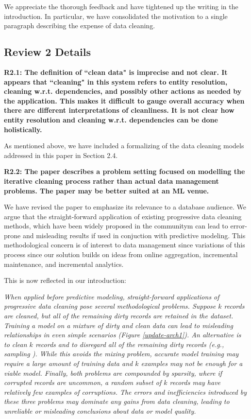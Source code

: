 We appreciate the thorough feedback and have tightened up the writing in the introduction. In particular, we have consolidated the motivation to a single paragraph describing the expense of data cleaning.


\subsection*{Review 2 Details}

\noindent\textbf{R2.1: The definition of ``clean data" is imprecise and not clear. It appears that ``cleaning" in this system refers to entity resolution, cleaning w.r.t. dependencies, and possibly other actions as needed by the application. This makes it difficult to gauge overall accuracy when there are different interpretations of cleanliness. It is not clear how entity resolution and cleaning w.r.t. dependencies can be done holistically.}

As mentioned above, we have included a formalizing of the data cleaning models addressed in this paper in Section 2.4. 

\vspace{0.5em}

\noindent\textbf{R2.2: The paper describes a problem setting focused on modelling the iterative cleaning process rather than actual data management problems. The paper may be better suited at an ML venue.}

We have revised the paper to emphasize its relevance to a database audience. We argue that the straight-forward application of existing progressive data cleaning methods, which have been widely proposed in the communitym can lead to error-prone and misleading results if used in conjuction with predictive modeling. This methodological concern is of interest to data management since variations of this process since our solution builds on ideas from online aggregation, incremental maintenance, and incremental analytics.

This is now reflected in our introduction:

\emph{When applied before predictive modeling, straight-forward applications of progressive data cleaning pose several methodological problems.
Suppose $k$ records are cleaned, but all of the remaining dirty records are retained in the dataset.
Training a model on a mixture of dirty and clean data can lead to misleading relationships in even simple scenarios (Figure \ref{update-arch1}).
An alternative is to clean $k$ records and to disregard all of the remaining dirty records (e.g., sampling \cite{wang1999sample}).
While this avoids the mixing problem, accurate model training may require a large amount of training data and $k$ examples may not be enough for a viable model.
Finally, both problems are compounded by sparsity, where if corrupted records are uncommon, a random subset of $k$ records may have relatively few examples of corruptions.
The errors and inefficiencies introduced by these three problems may dominate any gains from data cleaning, leading to unreliable or misleading conclusions about data or model quality.}

